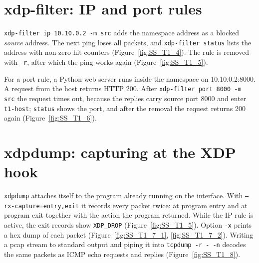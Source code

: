 
\section{xdp-filter: IP and port rules}
\texttt{xdp-filter ip 10.10.0.2 -m src} adds the namespace address as a blocked \emph{source} address. The next ping loses all packets, and \texttt{xdp-filter status} lists the address with non-zero hit counters (Figure~\ref{fig:SS_T1_4}). The rule is removed with \texttt{-r}, after which the ping works again (Figure~\ref{fig:SS_T1_5}).

For a port rule, a Python web server runs inside the namespace on 10.10.0.2:8000. A request from the host returns HTTP 200. After \texttt{xdp-filter port 8000 -m src} the request times out, because the replies carry source port 8000 and enter \texttt{t1-host}; \texttt{status} shows the port, and after the removal the request returns 200 again (Figure~\ref{fig:SS_T1_6}).


\section{xdpdump: capturing at the XDP hook}
\texttt{xdpdump} attaches itself to the program already running on the interface. With \texttt{--rx-capture=entry,exit} it records every packet twice: at program entry and at program exit together with the action the program returned. While the IP rule is active, the exit records show \texttt{XDP\_DROP} (Figure~\ref{fig:SS_T1_5}). Option \texttt{-x} prints a hex dump of each packet (Figure~\ref{fig:SS_T1_7_1}, \ref{fig:SS_T1_7_2}). Writing a pcap stream to standard output and piping it into \texttt{tcpdump -r - -n} decodes the same packets as ICMP echo requests and replies (Figure~\ref{fig:SS_T1_8}).

